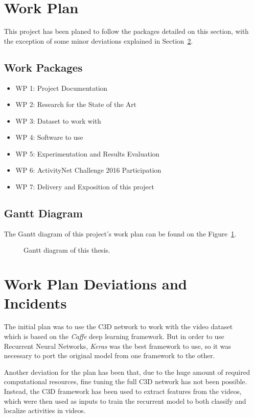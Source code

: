 \section{Work Plan}

This project has been planed to follow the packages detailed on this section, with the exception of some minor deviations explained in Section~\ref{section:work_plan_deviations}.

\subsection{Work Packages}

\begin{itemize}
    \item WP 1: Project Documentation
    \item WP 2: Research for the State of the Art
    \item WP 3: Dataset to work with
    \item WP 4: Software to use
    \item WP 5: Experimentation and Results Evaluation
    \item WP 6: ActivityNet Challenge 2016 Participation
    \item WP 7: Delivery and Exposition of this project
\end{itemize}

\subsection{Gantt Diagram}

The Gantt diagram of this project's work plan can be found on the Figure~\ref{fig:gantt_diagram}.

\begin{figure}[H]
\begin{center}
\end{center}
\caption{Gantt diagram of this thesis.}
\label{fig:gantt_diagram}
\end{figure}

\section{Work Plan Deviations and Incidents}
\label{section:work_plan_deviations}

The initial plan was to use the C3D\cite{tran2014learning} network to work with the video dataset which is based on the \textit{Caffe} deep learning framework. But in order to use Recurrent Neural Networks, \textit{Keras} was the best framework to use, so it was necessary to port the original model from one framework to the other.

Another deviation for the plan has been that, due to the huge amount of required computational resources, fine tuning the full C3D network has not been possible. Instead, the C3D framework has been used to extract features from the videos, which were then used as inputs to train the recurrent model to both classify and localize activities in videos.

